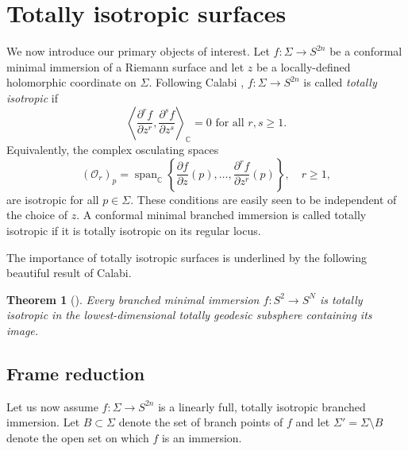\documentclass[11pt]{article}
\newtheorem{theorem}{Theorem}[section]
\theoremstyle{definition}
\newcommand{\C}{\mathbb{C}}
\numberwithin{equation}{section}
\begin{document}
\section{Totally isotropic surfaces}\label{sect:totallyisotropic}

\indent \indent We now introduce our primary objects of interest. Let $f : \Sigma \to S^{2n}$ be a conformal minimal immersion of a Riemann surface and let $z$ be a locally-defined holomorphic coordinate on $\Sigma.$ Following Calabi \cite{Calabi67}, $f : \Sigma \to S^{2n}$ is called \emph{totally isotropic} if
\begin{equation*}
    \left\langle \frac{\partial^r f}{\partial z^r}, \frac{\partial^s f}{\partial z^s} \right\rangle_\C = 0 \text{ for all } r, s \geq 1.
\end{equation*}
Equivalently, the complex osculating spaces
\begin{equation*}
    (\mathcal O_r)_p = \operatorname{span}_{\C} \left\lbrace         \frac{\partial f}{\partial z}(p), \ldots, \frac{\partial^r f}{\partial z^r}(p) \right\rbrace, \quad r \geq 1,
\end{equation*}
are isotropic for all $p \in \Sigma$. These conditions are easily seen to be independent of the choice of $z.$ A conformal minimal branched immersion is called totally isotropic if it is totally isotropic on its regular locus.

The importance of totally isotropic surfaces is underlined by the following beautiful result of Calabi.

\begin{theorem}[\cite{Calabi67}]\label{thm:calabi}
	Every branched minimal immersion $f: S^2 \to S^{N}$ is totally isotropic in the lowest-dimensional totally geodesic subsphere containing its image.
\end{theorem}

\subsection{Frame reduction}

\indent \indent Let us now assume $f: \Sigma \to S^{2n}$ is a linearly full, totally isotropic branched immersion. Let $B \subset \Sigma$ denote the set of branch points of $f$ and let $\Sigma'= \Sigma \setminus B$ denote the open set on which $f$ is an immersion.
\end{document}
